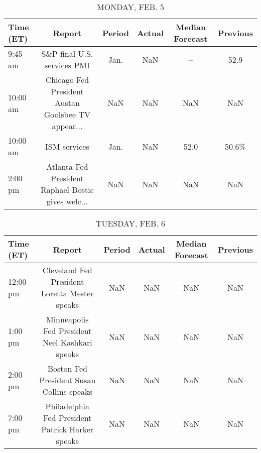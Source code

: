 \documentclass{article}%
\begin{document}
%
\normalsize%


\begin{table}[htbp]%
\caption{MONDAY, FEB. 5}%
\centering%
\begin{adjustbox}{width=1\textwidth}%
\begin{tabular}{lccccc}
\toprule
Time (ET) &                                             Report & Period & Actual & Median Forecast & Previous \\
\midrule
  9:45 am &                        S\&P final U.S. services PMI &   Jan. &    NaN &              -- &     52.9 \\
 10:00 am & Chicago Fed President Austan Goolsbee TV appear... &    NaN &    NaN &             NaN &      NaN \\
 10:00 am &                                       ISM services &   Jan. &    NaN &            52.0 &    50.6\% \\
  2:00 pm & Atlanta Fed President Raphael Bostic gives welc... &    NaN &    NaN &             NaN &      NaN \\
\bottomrule
\end{tabular}
%
\end{adjustbox}%
\end{table}

%


\begin{table}[htbp]%
\caption{TUESDAY, FEB. 6}%
\centering%
\begin{adjustbox}{width=1\textwidth}%
\begin{tabular}{lccccc}
\toprule
Time (ET) &                                           Report & Period & Actual & Median Forecast & Previous \\
\midrule
 12:00 pm &    Cleveland Fed President Loretta Mester speaks &    NaN &    NaN &             NaN &      NaN \\
  1:00 pm &   Minneapolis Fed President Neel Kashkari speaks &    NaN &    NaN &             NaN &      NaN \\
  2:00 pm &        Boston Fed President Susan Collins speaks &    NaN &    NaN &             NaN &      NaN \\
  7:00 pm & Philadelphia Fed President Patrick Harker speaks &    NaN &    NaN &             NaN &      NaN \\
\bottomrule
\end{tabular}
%
\end{adjustbox}%
\end{table}

%
\end{document}
